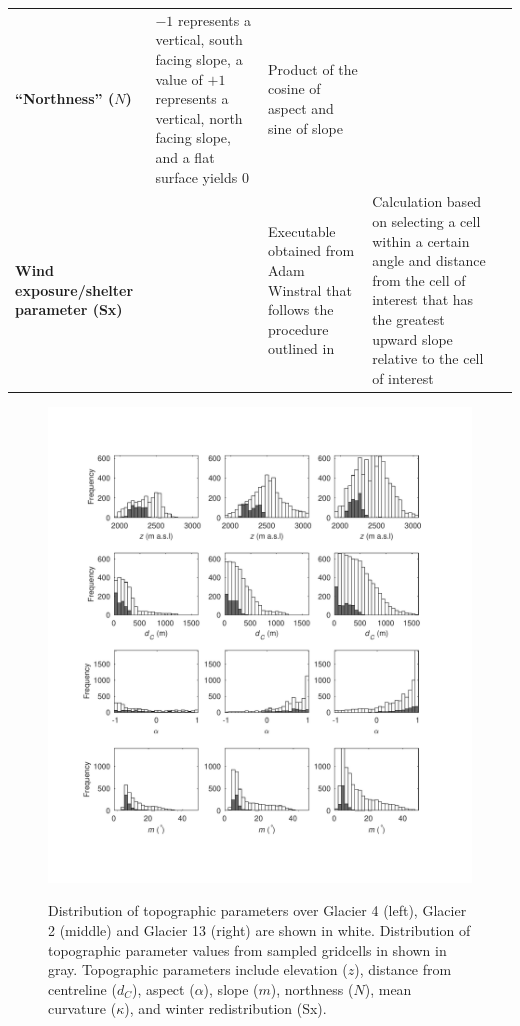 \documentclass[twocolumn, letterpaper]{igs}
\begin{document}
\begin{table}[!htbp]
\begin{tabularx}{\linewidth}{XXXXX}
\textbf{``Northness'' ($N$)} & $-1$ represents a vertical, south facing slope, a value of $+1$ represents a vertical, north facing slope, and a flat surface yields 0 & Product of the cosine of aspect and sine of slope &  & \cite{Molotch2005} \\
\textbf{Wind exposure/shelter parameter (Sx)} &  & Executable obtained from Adam Winstral that follows the procedure outlined in \cite{Winstral2002} & Calculation based on selecting a cell within a certain angle and distance from the cell of interest that has the greatest upward slope relative to the cell of interest & \cite{Winstral2002}
\end{tabularx}
\end{table}

\begin{figure}
	\centering
	\includegraphics[width =\textwidth]{TopoParamsSampled1.pdf}\\
	\caption{Distribution of topographic parameters over Glacier 4 (left), Glacier 2 (middle) and Glacier 13 (right) are shown in white. Distribution of topographic parameter values from sampled gridcells in shown in gray. Topographic parameters include elevation ($z$), distance from centreline ($d_C$), aspect ($\alpha$), slope ($m$), northness ($N$), mean curvature ($\kappa$), and winter redistribution (Sx).}
	\label{fig:TopoParamsSampled1}
\end{figure}
\end{document}
